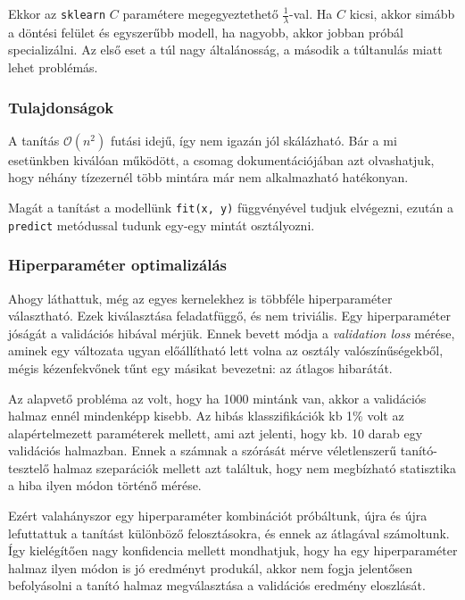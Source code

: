 \noindent
Ekkor az \texttt{sklearn} $ C $ paramétere megegyeztethető $ \frac{1}{\lambda} $-val.
Ha $ C $ kicsi, akkor simább a döntési felület és egyszerűbb modell, ha nagyobb, akkor 
jobban próbál specializálni. Az első eset a túl nagy általánosság, a második a túltanulás
miatt lehet problémás.




\subsubsection{Tulajdonságok}

\noindent
A tanítás $ \mathcal{O}(n^2) $ futási idejű, így nem igazán jól skálázható. Bár a mi 
esetünkben kiválóan működött, a csomag dokumentációjában azt olvashatjuk, hogy néhány tízezernél
több mintára már nem alkalmazható hatékonyan.


Magát a tanítást a modellünk \texttt{fit(x, y)} függvényével tudjuk elvégezni, ezután 
a \texttt{predict} metódussal tudunk egy-egy mintát osztályozni.



\subsubsection{Hiperparaméter optimalizálás}

Ahogy láthattuk, még az egyes kernelekhez is többféle hiperparaméter választható. Ezek kiválasztása
feladatfüggő, és nem triviális. Egy hiperparaméter jóságát a validációs hibával mérjük. Ennek 
bevett módja a \textit{validation loss} mérése, aminek egy változata ugyan előállítható lett volna 
az osztály valószínűségekből, mégis kézenfekvőnek tűnt egy másikat bevezetni: az átlagos hibarátát.

Az alapvető probléma az volt, hogy ha 1000 mintánk van, akkor a validációs halmaz ennél mindenképp
kisebb. Az hibás klasszifikációk kb 1\% volt az alapértelmezett paraméterek mellett, ami azt
jelenti, hogy kb. 10 darab egy validációs halmazban. Ennek a számnak a szórását mérve véletlenszerű
tanító-tesztelő halmaz szeparációk mellett azt találtuk, hogy nem megbízható statisztika a 
hiba ilyen módon történő mérése.

Ezért valahányszor egy hiperparaméter kombinációt próbáltunk, újra és újra lefuttattuk a
tanítást különböző felosztásokra, és ennek az átlagával számoltunk. Így kielégítően nagy 
konfidencia mellett mondhatjuk, hogy ha egy hiperparaméter halmaz ilyen módon is jó eredményt
produkál, akkor nem fogja jelentősen befolyásolni a tanító halmaz megválasztása a validációs 
eredmény eloszlását.

